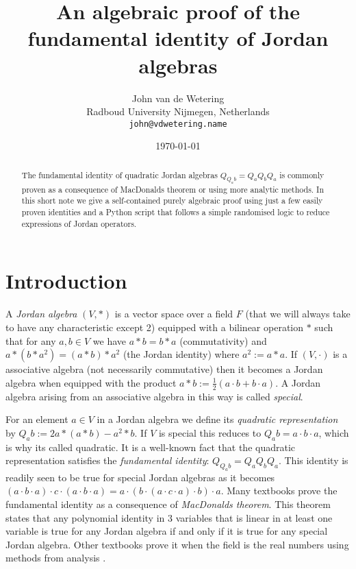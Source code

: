 \documentclass{article}
\begin{document}
\title{An algebraic proof of the fundamental identity of Jordan algebras}
\author{John van de Wetering \\
       Radboud University Nijmegen, Netherlands\\
       \texttt{john@vdwetering.name}}
\date{\today}
\maketitle

\begin{abstract}
    The fundamental identity of quadratic Jordan algebras $Q_{Q_a b} = Q_aQ_bQ_a$ is commonly proven as a consequence of MacDonalds theorem or using more analytic methods. In this short note we give a self-contained purely algebraic proof using just a few easily proven identities and a Python script that follows a simple randomised logic to reduce expressions of Jordan operators.
\end{abstract}

\section{Introduction}
A \emph{Jordan algebra} $(V,*)$ is a vector space over a field $F$ (that we will always take to have any characteristic except 2) equipped with a bilinear operation $*$ such that for any $a,b\in V$ we have $a*b = b*a$ (commutativity) and $a*(b*a^2) = (a*b)*a^2$ (the Jordan identity) where $a^2:= a*a$. If $(V,\cdot)$ is a associative algebra (not necessarily commutative) then it becomes a Jordan algebra when equipped with the product $a*b:= \frac{1}{2}(a\cdot b + b\cdot a)$. A Jordan algebra arising from an associative algebra in this way is called \emph{special}.

For an element $a\in V$ in a Jordan algebra we define its \emph{quadratic representation} by $Q_a b:= 2a*(a*b) - a^2*b$. If $V$ is special this reduces to $Q_a b = a\cdot b\cdot a$, which is why its called quadratic. It is a well-known fact that the quadratic representation satisfies the \emph{fundamental identity}: $Q_{Q_a b} = Q_aQ_bQ_a$. This identity is readily seen to be true for special Jordan algebras as it becomes $(a\cdot b\cdot a)\cdot c \cdot (a\cdot b\cdot a) = a\cdot (b\cdot(a\cdot c\cdot a)\cdot b)\cdot a$. Many textbooks \cite{hanche1984jordan,alfsen2012geometry,chu2011jordan,mccrimmon2006taste} prove the fundamental identity as a consequence of \emph{MacDonalds theorem}. This theorem states that any polynomial identity in 3 variables that is linear in at least one variable is true for any Jordan algebra if and only if it is true for any special Jordan algebra. Other textbooks prove it when the field is the real numbers using methods from analysis \cite{faraut1994analysis}.
\end{document}
